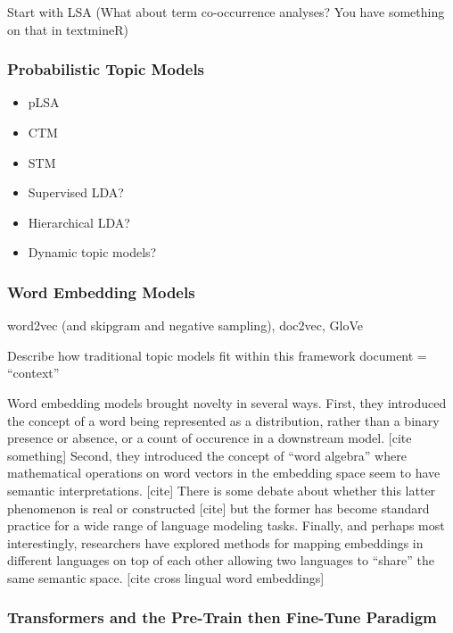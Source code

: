 \documentclass[conference,final,]{IEEEtran}
\providecommand{\tightlist}{%
  \setlength{\itemsep}{0pt}\setlength{\parskip}{0pt}}
\begin{document}
Start with LSA (What about term co-occurrence analyses? You have
something on that in textmineR)

\hypertarget{probabilistic-topic-models}{%
\subsubsection{Probabilistic Topic
Models}\label{probabilistic-topic-models}}

\begin{itemize}
\tightlist
\item
  pLSA
\item
  CTM
\item
  STM
\item
  Supervised LDA?
\item
  Hierarchical LDA?
\item
  Dynamic topic models?
\end{itemize}

\hypertarget{word-embedding-models}{%
\subsubsection{Word Embedding Models}\label{word-embedding-models}}

word2vec (and skipgram and negative sampling), doc2vec, GloVe

Describe how traditional topic models fit within this framework document
= ``context''

Word embedding models brought novelty in several ways. First, they
introduced the concept of a word being represented as a distribution,
rather than a binary presence or absence, or a count of occurence in a
downstream model. {[}cite something{]} Second, they introduced the
concept of ``word algebra'' where mathematical operations on word
vectors in the embedding space seem to have semantic interpretations.
{[}cite{]} There is some debate about whether this latter phenomenon is
real or constructed {[}cite{]} but the former has become standard
practice for a wide range of language modeling tasks. Finally, and
perhaps most interestingly, researchers have explored methods for
mapping embeddings in different languages on top of each other allowing
two languages to ``share'' the same semantic space. {[}cite cross
lingual word embeddings{]}

\hypertarget{transformers-and-the-pre-train-then-fine-tune-paradigm}{%
\subsubsection{Transformers and the Pre-Train then Fine-Tune
Paradigm}\label{transformers-and-the-pre-train-then-fine-tune-paradigm}}
\end{document}
